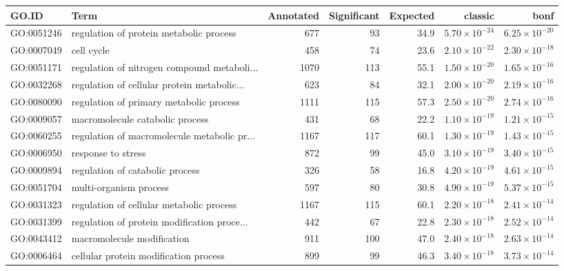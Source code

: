 \begin{table}[ht]
\centering
\begin{adjustbox}{max width=\textwidth}
\begin{tabular}{llrrrrr}
  \hline
GO.ID & Term & Annotated & Significant & Expected & classic & bonf \\ 
  \hline
GO:0051246 & regulation of protein metabolic process & 677 & 93 & 34.9 & $5.70 \times 10^{-24}$ & $6.25 \times 10^{-20}$ \\ 
  GO:0007049 & cell cycle & 458 & 74 & 23.6 & $2.10 \times 10^{-22}$ & $2.30 \times 10^{-18}$ \\ 
  GO:0051171 & regulation of nitrogen compound metaboli... & 1070 & 113 & 55.1 & $1.50 \times 10^{-20}$ & $1.65 \times 10^{-16}$ \\ 
  GO:0032268 & regulation of cellular protein metabolic... & 623 & 84 & 32.1 & $2.00 \times 10^{-20}$ & $2.19 \times 10^{-16}$ \\ 
  GO:0080090 & regulation of primary metabolic process & 1111 & 115 & 57.3 & $2.50 \times 10^{-20}$ & $2.74 \times 10^{-16}$ \\ 
  GO:0009057 & macromolecule catabolic process & 431 & 68 & 22.2 & $1.10 \times 10^{-19}$ & $1.21 \times 10^{-15}$ \\ 
  GO:0060255 & regulation of macromolecule metabolic pr... & 1167 & 117 & 60.1 & $1.30 \times 10^{-19}$ & $1.43 \times 10^{-15}$ \\ 
  GO:0006950 & response to stress & 872 & 99 & 45.0 & $3.10 \times 10^{-19}$ & $3.40 \times 10^{-15}$ \\ 
  GO:0009894 & regulation of catabolic process & 326 & 58 & 16.8 & $4.20 \times 10^{-19}$ & $4.61 \times 10^{-15}$ \\ 
  GO:0051704 & multi-organism process & 597 & 80 & 30.8 & $4.90 \times 10^{-19}$ & $5.37 \times 10^{-15}$ \\ 
  GO:0031323 & regulation of cellular metabolic process & 1167 & 115 & 60.1 & $2.20 \times 10^{-18}$ & $2.41 \times 10^{-14}$ \\ 
  GO:0031399 & regulation of protein modification proce... & 442 & 67 & 22.8 & $2.30 \times 10^{-18}$ & $2.52 \times 10^{-14}$ \\ 
  GO:0043412 & macromolecule modification & 911 & 100 & 47.0 & $2.40 \times 10^{-18}$ & $2.63 \times 10^{-14}$ \\ 
  GO:0006464 & cellular protein modification process & 899 & 99 & 46.3 & $3.40 \times 10^{-18}$ & $3.73 \times 10^{-14}$ \\ 

\end{tabular}
\end{adjustbox}
\end{table}
